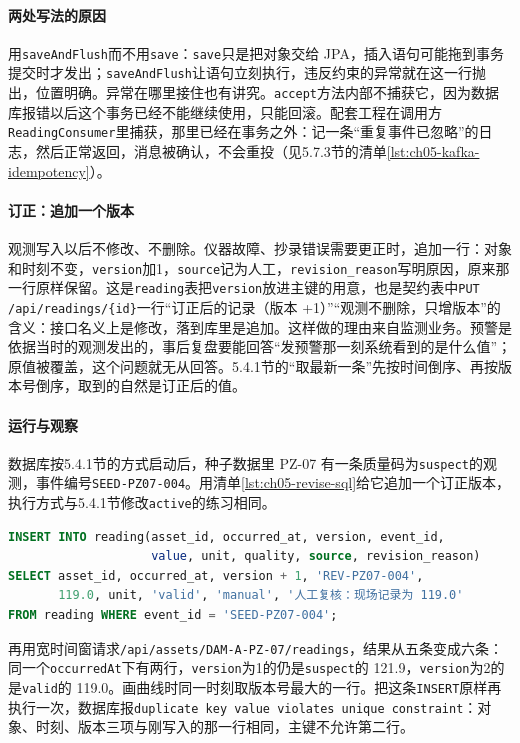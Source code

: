 \paragraph{两处写法的原因}用\texttt{saveAndFlush}而不用\texttt{save}：\texttt{save}只是把对象交给 JPA，插入语句可能拖到事务提交时才发出；\texttt{saveAndFlush}让语句立刻执行，违反约束的异常就在这一行抛出，位置明确。异常在哪里接住也有讲究。\texttt{accept}方法内部不捕获它，因为数据库报错以后这个事务已经不能继续使用，只能回滚。配套工程在调用方\texttt{ReadingConsumer}里捕获，那里已经在事务之外：记一条“重复事件已忽略”的日志，然后正常返回，消息被确认，不会重投（见5.7.3节的清单\ref{lst:ch05-kafka-idempotency}）。

\paragraph{订正：追加一个版本}观测写入以后不修改、不删除。仪器故障、抄录错误需要更正时，追加一行：对象和时刻不变，\texttt{version}加1，\texttt{source}记为人工，\texttt{revision\_reason}写明原因，原来那一行原样保留。这是\texttt{reading}表把\texttt{version}放进主键的用意，也是契约表中\texttt{PUT /api/readings/\{id\}}一行“订正后的记录（版本 +1）”“观测不删除，只增版本”的含义：接口名义上是修改，落到库里是追加。这样做的理由来自监测业务。预警是依据当时的观测发出的，事后复盘要能回答“发预警那一刻系统看到的是什么值”；原值被覆盖，这个问题就无从回答。5.4.1节的“取最新一条”先按时间倒序、再按版本号倒序，取到的自然是订正后的值。

\paragraph{运行与观察}数据库按5.4.1节的方式启动后，种子数据里 PZ-07 有一条质量码为\texttt{suspect}的观测，事件编号\texttt{SEED-PZ07-004}。用清单\ref{lst:ch05-revise-sql}给它追加一个订正版本，执行方式与5.4.1节修改\texttt{active}的练习相同。

\begin{lstlisting}[label={lst:ch05-revise-sql},language=SQL,caption={订正一条可疑观测：复制原行，版本号加 1，写明原因}]
INSERT INTO reading(asset_id, occurred_at, version, event_id,
                    value, unit, quality, source, revision_reason)
SELECT asset_id, occurred_at, version + 1, 'REV-PZ07-004',
       119.0, unit, 'valid', 'manual', '人工复核：现场记录为 119.0'
FROM reading WHERE event_id = 'SEED-PZ07-004';
\end{lstlisting}

再用宽时间窗请求\texttt{/api/assets/DAM-A-PZ-07/readings}，结果从五条变成六条：同一个\texttt{occurredAt}下有两行，\texttt{version}为1的仍是\texttt{suspect}的 121.9，\texttt{version}为2的是\texttt{valid}的 119.0。画曲线时同一时刻取版本号最大的一行。把这条\texttt{INSERT}原样再执行一次，数据库报\texttt{duplicate key value violates unique constraint}：对象、时刻、版本三项与刚写入的那一行相同，主键不允许第二行。

